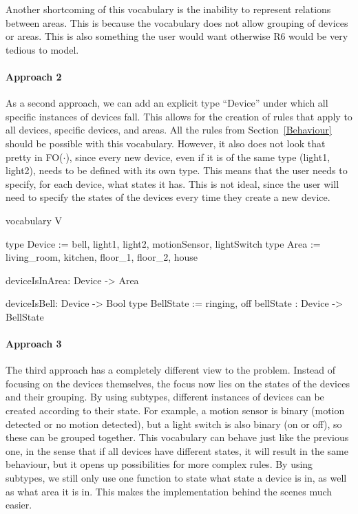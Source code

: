 \documentclass[11pt,a4paper]{report}
\newcommand{\fodot}{FO($\cdot$)\xspace}
\begin{document}
Another shortcoming of this vocabulary is the inability to represent relations between areas. This is because the vocabulary does not allow grouping of devices or areas. This is also something the user would want otherwise R6 would be very tedious to model.

\paragraph{Approach 2}
As a second approach, we can add an explicit type ``Device'' under which all specific instances of devices fall. This allows for the creation of rules that apply to all devices, specific devices, and areas. All the rules from Section~\ref{Behaviour} should be possible with this vocabulary. However, it also does not look that pretty in \fodot, since every new device, even if it is of the same type (light1, light2), needs to be defined with its own type. This means that the user needs to specify, for each device, what states it has. This is not ideal, since the user will need to specify the states of the devices every time they create a new device.

\begin{idplisting}
vocabulary V {
   type Device := {bell, light1, light2, motionSensor, lightSwitch}
   type Area := {living_room, kitchen, floor_1, floor_2, house}

   deviceIsInArea: Device -> Area

   deviceIsBell: Device -> Bool
   type BellState := {ringing, off}
   bellState : Device -> BellState
}
\end{idplisting}

\paragraph{Approach 3}
The third approach has a completely different view to the problem. Instead of focusing on the devices themselves, the focus now lies on the states of the devices and their grouping. By using subtypes, different instances of devices can be created according to their state. For example, a motion sensor is binary (motion detected or no motion detected), but a light switch is also binary (on or off), so these can be grouped together. This vocabulary can behave just like the previous one, in the sense that if all devices have different states, it will result in the same behaviour, but it opens up possibilities for more complex rules. By using subtypes, we still only use one function to state what state a device is in, as well as what area it is in. This makes the implementation behind the scenes much easier.
\end{document}
